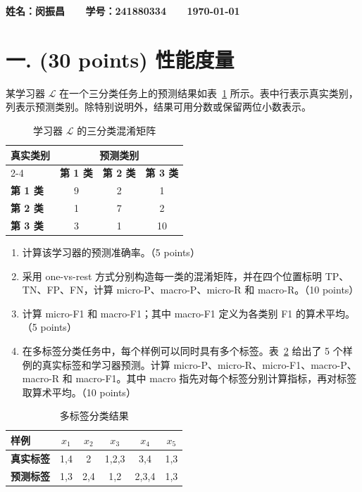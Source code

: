 \documentclass[8pt]{article}
\begin{document}
\setlength{\abovedisplayskip}{4pt}
\setlength{\belowdisplayskip}{4pt}
\setlength{\abovedisplayshortskip}{2pt}
\setlength{\belowdisplayshortskip}{2pt}

\textbf{\color{blue} \Large
姓名：闵振昌 \ \ \ 学号：241880334 \ \ \ \today}

\section*{一. (30 points) 性能度量}

某学习器 $\mathcal{L}$ 在一个三分类任务上的预测结果如表~\ref{tab:confusion} 所示。表中行表示真实类别，列表示预测类别。除特别说明外，结果可用分数或保留两位小数表示。

\begin{table}[H]
\centering
\begin{tabular}{lccc}
\toprule
\multirow{2}{*}{\textbf{真实类别}} & \multicolumn{3}{c}{\textbf{预测类别}} \\
\cmidrule(lr){2-4}
 & \textbf{第 1 类} & \textbf{第 2 类} & \textbf{第 3 类} \\
\midrule
\textbf{第 1 类} & 9 & 2 & 1 \\
\textbf{第 2 类} & 1 & 7 & 2 \\
\textbf{第 3 类} & 3 & 1 & 10 \\
\bottomrule
\end{tabular}
\caption{学习器 $\mathcal{L}$ 的三分类混淆矩阵}
\label{tab:confusion}
\end{table}

\begin{enumerate}[leftmargin=2.2em,itemsep=0.45em]
  \item 计算该学习器的预测准确率。（5 points）
  \item 采用 one-vs-rest 方式分别构造每一类的混淆矩阵，并在四个位置标明 TP、TN、FP、FN，计算 micro-P、macro-P、micro-R 和 macro-R。（10 points）
  \item 计算 micro-F1 和 macro-F1；其中 macro-F1 定义为各类别 F1 的算术平均。（5 points）
  \item 在多标签分类任务中，每个样例可以同时具有多个标签。表~\ref{tab:multilabel} 给出了 5 个样例的真实标签和学习器预测。计算 micro-P、micro-R、micro-F1、macro-P、macro-R 和 macro-F1。其中 macro 指先对每个标签分别计算指标，再对标签取算术平均。（10 points）
\end{enumerate}

\begin{table}[H]
\centering
\begin{tabular}{lccccc}
\toprule
\textbf{样例} & $x_1$ & $x_2$ & $x_3$ & $x_4$ & $x_5$ \\
\midrule
\textbf{真实标签} & 1,4 & 2 & 1,2,3 & 3,4 & 1,3 \\
\textbf{预测标签} & 1,3 & 2,4 & 1,2 & 2,3,4 & 1,3 \\
\bottomrule
\end{tabular}
\caption{多标签分类结果}
\label{tab:multilabel}
\end{table}
\end{document}
